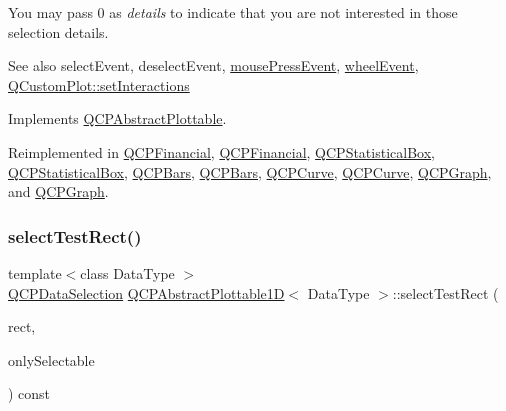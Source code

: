 You may pass 0 as {\itshape details} to indicate that you are not interested in those selection details.

\begin{DoxySeeAlso}{See also}
select\+Event, deselect\+Event, \hyperlink{class_q_c_p_layerable_af6567604818db90f4fd52822f8bc8376}{mouse\+Press\+Event}, \hyperlink{class_q_c_p_layerable_a47dfd7b8fd99c08ca54e09c362b6f022}{wheel\+Event}, \hyperlink{class_q_custom_plot_a5ee1e2f6ae27419deca53e75907c27e5}{Q\+Custom\+Plot\+::set\+Interactions} 
\end{DoxySeeAlso}


Implements \hyperlink{class_q_c_p_abstract_plottable_a38efe9641d972992a3d44204bc80ec1d}{Q\+C\+P\+Abstract\+Plottable}.



Reimplemented in \hyperlink{class_q_c_p_financial_aac8e91622ac58330fa9ce81cc8fd40ee}{Q\+C\+P\+Financial}, \hyperlink{class_q_c_p_financial_a6067c625621b07a85a6989a0a4b8d309}{Q\+C\+P\+Financial}, \hyperlink{class_q_c_p_statistical_box_a1607fa92f829c631107c20ccb2d70a6d}{Q\+C\+P\+Statistical\+Box}, \hyperlink{class_q_c_p_statistical_box_ae78bfe096f463a8d08464c20cc25defe}{Q\+C\+P\+Statistical\+Box}, \hyperlink{class_q_c_p_bars_a121f899c27af3186fe93dcd0eb98f49b}{Q\+C\+P\+Bars}, \hyperlink{class_q_c_p_bars_a7b282a2932c7c0b4a45bd61e8c490153}{Q\+C\+P\+Bars}, \hyperlink{class_q_c_p_curve_a0ed9b7e6b4bc72010d6fcd974af46a8b}{Q\+C\+P\+Curve}, \hyperlink{class_q_c_p_curve_a0b3f4916f33b692508a6a1292b46880e}{Q\+C\+P\+Curve}, \hyperlink{class_q_c_p_graph_a6d669d04462d272c6aa0e5f85846d673}{Q\+C\+P\+Graph}, and \hyperlink{class_q_c_p_graph_ab70a737dabcedbd4da4a0bc5a9cff60e}{Q\+C\+P\+Graph}.

\mbox{\label{class_q_c_p_abstract_plottable1_d_ac385c38a79e419ed3600c2ee398fd216}} 
\subsubsection{\texorpdfstring{select\+Test\+Rect()}{selectTestRect()}\hspace{0.1cm}{\footnotesize\ttfamily [1/2]}}
{\footnotesize\ttfamily template$<$class Data\+Type $>$ \\
\hyperlink{class_q_c_p_data_selection}{Q\+C\+P\+Data\+Selection} \hyperlink{class_q_c_p_abstract_plottable1_d}{Q\+C\+P\+Abstract\+Plottable1D}$<$ Data\+Type $>$\+::select\+Test\+Rect (\begin{DoxyParamCaption}\item[{const Q\+RectF \&}]{rect,  }\item[{bool}]{only\+Selectable }\end{DoxyParamCaption}) const\hspace{0.3cm}{\ttfamily [virtual]}}

